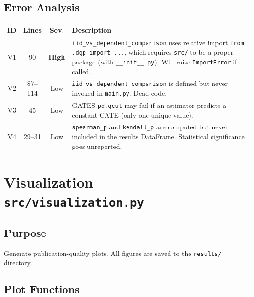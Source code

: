 \documentclass[11pt, letterpaper]{article}
\begin{document}
\subsection{Error Analysis}

\begin{center}
\begin{tabularx}{\textwidth}{c c c X}
    \toprule
    \textbf{ID} & \textbf{Lines} & \textbf{Sev.} & \textbf{Description} \\
    \midrule
    V1 & 90 & \textcolor{highsev}{\textbf{High}} &
        \texttt{iid\_vs\_dependent\_comparison} uses relative import \texttt{from .dgp import ...}, which requires \texttt{src/} to be a proper package (with \texttt{\_\_init\_\_.py}). Will raise \texttt{ImportError} if called. \\[6pt]
    V2 & 87--114 & \textcolor{lowsev}{Low} &
        \texttt{iid\_vs\_dependent\_comparison} is defined but never invoked in \texttt{main.py}. Dead code. \\[6pt]
    V3 & 45 & \textcolor{lowsev}{Low} &
        GATES \texttt{pd.qcut} may fail if an estimator predicts a constant CATE (only one unique value). \\[6pt]
    V4 & 29--31 & \textcolor{lowsev}{Low} &
        \texttt{spearman\_p} and \texttt{kendall\_p} are computed but never included in the results DataFrame. Statistical significance goes unreported. \\
    \bottomrule
\end{tabularx}
\end{center}


\newpage
\section{Visualization --- \texttt{src/visualization.py}}
\label{sec:visualization}

\subsection{Purpose}
Generate publication-quality plots. All figures are saved to the \texttt{results/} directory.

\subsection{Plot Functions}
\end{document}
